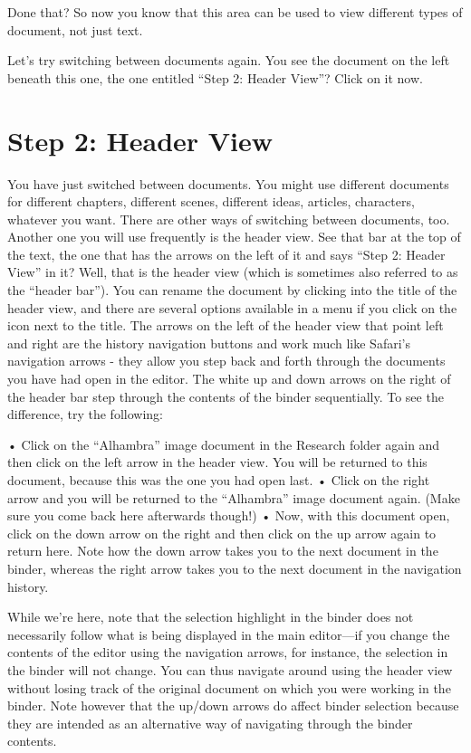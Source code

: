 \documentclass[10pt,oneside]{memoir}
\begin{document}
Done that? So now you know that this area can be used to view different types of document, not just text.


Let's try switching between documents again. You see the document on the left beneath this one, the one entitled ``Step 2: Header View''? Click on it now.


\pagebreak \chapter{Step 2: Header View}
\label{step2:headerview}

You have just switched between documents. You might use different documents for different chapters, different scenes, different ideas, articles, characters, whatever you want. There are other ways of switching between documents, too. Another one you will use frequently is the header view. See that bar at the top of the text, the one that has the arrows on the left of it and says ``Step 2: Header View'' in it? Well, that is the header view (which is sometimes also referred to as the ``header bar''). You can rename the document by clicking into the title of the header view, and there are several options available in a menu if you click on the icon next to the title.
The arrows on the left of the header view that point left and right are the history navigation buttons and work much like Safari's navigation arrows - they allow you step back and forth through the documents you have had open in the editor. The white up and down arrows on the right of the header bar step through the contents of the binder sequentially. To see the difference, try the following:


• Click on the ``Alhambra'' image document in the Research folder again and then click on the left arrow in the header view. You will be returned to this document, because this was the one you had open last.
• Click on the right arrow and you will be returned to the ``Alhambra'' image document again. (Make sure you come back here afterwards though!)
• Now, with this document open, click on the down arrow on the right and then click on the up arrow again to return here. Note how the down arrow takes you to the next document in the binder, whereas the right arrow takes you to the next document in the navigation history.


While we're here, note that the selection highlight in the binder does not necessarily follow what is being displayed in the main editor---if you change the contents of the editor using the navigation arrows, for instance, the selection in the binder will not change. You can thus navigate around using the header view without losing track of the original document on which you were working in the binder. Note however that the up/down arrows do affect binder selection because they are intended as an alternative way of navigating through the binder contents.
\end{document}
